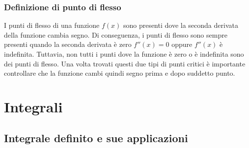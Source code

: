\documentclass{article}
\begin{document}
\subsubsection{Definizione di punto di flesso}


I punti di flesso di una funzione \(f(x)\) sono presenti dove la seconda derivata
della funzione cambia segno. Di conseguenza, i punti di flesso sono sempre presenti
quando la seconda derivata è zero \(f''(x)=0\) oppure \(f''(x)\) è indefinita.
Tuttavia, non tutti i punti dove la funzione è zero o è indefinita sono dei punti di flesso.
Una volta trovati questi due tipi di punti critici è importante controllare
che la funzione cambi quindi segno prima e dopo suddetto punto.

\newpage
\section{Integrali}

\subsection{Integrale definito e sue applicazioni}
\end{document}
